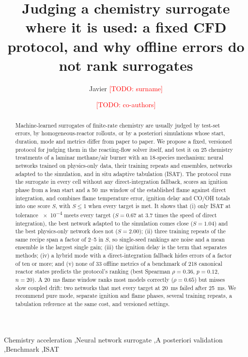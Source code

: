 \documentclass[preprint,review,12pt]{elsarticle}
\newcommand{\todo}[1]{\textcolor{red}{[TODO: #1]}}
\begin{document}
\begin{frontmatter}

\title{Judging a chemistry surrogate where it is used: a fixed CFD protocol, and why offline errors do not
rank surrogates}

\author[a]{Javier \todo{surname}}
\author[a]{\todo{co-authors}}
\address[a]{\todo{affiliation}}

\begin{abstract}
Machine-learned surrogates of finite-rate chemistry are usually judged by test-set errors, by
homogeneous-reactor rollouts, or by a posteriori simulations whose start, duration, mode and metrics differ
from paper to paper. We propose a fixed, versioned protocol for judging them in the reacting-flow solver
itself, and test it on 25 chemistry treatments of a laminar methane/air burner with an 18-species mechanism:
neural networks trained on physics-only data, their training repeats and ensembles, networks adapted to the
simulation, and in situ adaptive tabulation (ISAT). The protocol runs the surrogate in every cell without any
direct-integration fallback, scores an ignition phase from a lean start and a 50~ms window of the established
flame against direct integration, and combines flame temperature error, ignition delay and CO/OH totals into
one score $S$, with $S\le1$ when every target is met. It shows that (i) only ISAT at tolerance \num{e-4} meets
every target ($S=0.67$ at 3.7 times the speed of direct integration), the best network adapted to the
simulation comes close ($S=1.04$) and the best physics-only network does not ($S=2.00$); (ii) three training
repeats of the same recipe span a factor of 2--5 in $S$, so single-seed rankings are noise and a mean ensemble
is the largest single gain; (iii) the ignition delay is the term that separates methods; (iv) a hybrid mode
with a direct-integration fallback hides errors of a factor of ten or more; and (v) none of 33 offline
metrics of a benchmark of 218 canonical reactor states predicts the protocol's ranking (best Spearman
$\rho=0.36$, $p=0.12$, $n=20$). A 20~ms flame window ranks most models correctly ($\rho=0.65$) but misses slow
coupled drift: two networks that met every target at 20~ms failed after 25~ms. We recommend pure mode,
separate ignition and flame phases, several training repeats, a tabulation reference at the same cost, and
versioned settings.
\end{abstract}

\begin{keyword}
Chemistry acceleration \sep Neural network surrogate \sep A posteriori validation \sep Benchmark \sep ISAT
\end{keyword}
\end{frontmatter}
\end{document}

